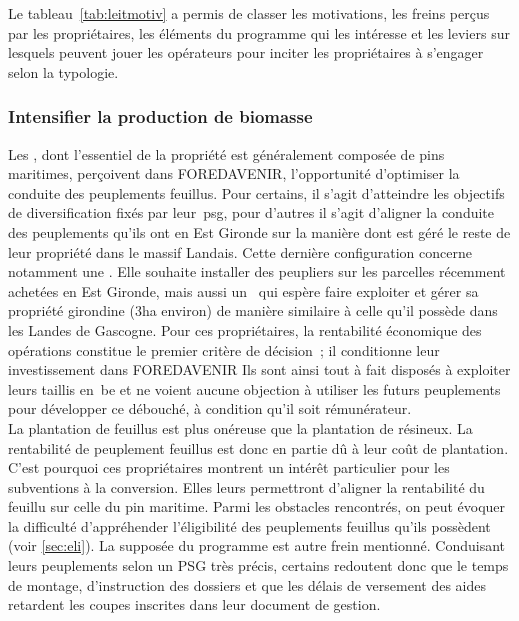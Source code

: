 \documentclass[12pt]{report}
\newcounter{table1}
\newcommand\indexp[1]{#1\index{#1}}
\begin{document}
Le tableau~\ref{tab:leitmotiv} a permis de classer les motivations, les freins
perçus par les propriétaires, les éléments du programme qui les intéresse et les
leviers sur lesquels peuvent jouer les opérateurs pour inciter les propriétaires
à s'engager selon la typologie.

\subsubsection{Intensifier la production de biomasse}


Les , dont l’essentiel de la propriété est
généralement composée de pins maritimes, perçoivent dans FOREDAVENIR,
l’opportunité d’optimiser la conduite des peuplements
feuillus. Pour certains, il s’agit d’atteindre les objectifs de diversification fixés par
leur~\gls{psg}, pour d’autres il s’agit d’aligner la conduite des peuplements qu’ils
ont en Est Gironde sur la manière dont est géré le reste de leur propriété dans
le massif Landais. Cette dernière configuration concerne notamment une
. Elle souhaite installer des peupliers sur les
parcelles récemment achetées en Est Gironde, mais aussi un~
qui espère faire exploiter et gérer sa propriété girondine (3ha environ) de
manière similaire à celle qu'il possède dans les Landes de Gascogne. Pour ces
propriétaires, la rentabilité économique des opérations constitue le
premier critère de décision~; il conditionne leur investissement dans
FOREDAVENIR Ils sont ainsi tout à fait disposés à exploiter
leurs taillis en~\gls{be} et ne voient aucune objection à utiliser les
futurs peuplements pour développer ce débouché, à condition qu’il soit
rémunérateur.\\ 

La plantation de feuillus est plus onéreuse que la plantation de résineux. La
rentabilité de peuplement feuillus est donc en partie dû à leur coût de
plantation. C'est pourquoi ces propriétaires montrent un intérêt particulier pour
les subventions à la conversion. Elles leurs permettront d'aligner la rentabilité
du feuillu sur celle du pin maritime. Parmi les obstacles rencontrés, on peut évoquer la difficulté
d’appréhender l’éligibilité des peuplements feuillus qu’ils possèdent
(voir \ref{sec:eli}). La
 supposée du programme est autre frein mentionné. Conduisant leurs
peuplements selon un \indexp{PSG} très précis, certains 
redoutent donc que le temps de montage, d’instruction des dossiers et que
les délais de versement des aides retardent les coupes inscrites dans leur
document de gestion.
\end{document}
